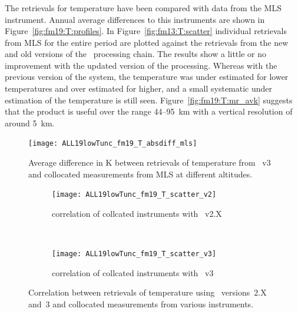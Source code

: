 
\subsubsection{}
\label{sec:fm19:comparison:temperature}
The retrievals for temperature have been compared with data from the MLS
instrument. Annual average differences to this instruments are shown in
Figure~\ref{fig:fm19:T:profiles}. In Figure~\ref{fig:fm13:T:scatter} individual
retrievals from MLS for the entire period are plotted against the retrievals
from the new and old versions of the \smr\ processing chain. The results show a
little or no improvement with the updated version of the processing. Whereas
with the previous version of the system, the temperature was under estimated
for lower temperatures and over estimated for higher, and a small systematic
under estimation of the temperature is still seen.
Figure~\ref{fig:fm19:T:mr_avk} suggests that the product is useful over the
range 44--95~km with a vertical resolution of around 5~km.

\begin{figure}[tbhp]
    \centering
    \texttt{[image: ALL19lowTunc\_fm19\_T\_absdiff\_mls]}
    \caption{Average difference in K between retrievals of temperature from
    \smr~v3 and collocated measurements from MLS at different altitudes.}
    \label{fig:fm19:T:profiles}
    \label{fig:fm19:T:profiles:MLS}
\end{figure}

\begin{figure}[tbhp]
    \centering
    \begin{subfigure}[b]{0.49\textwidth}
        \texttt{[image: ALL19lowTunc\_fm19\_T\_scatter\_v2]}
        \caption{correlation of collcated instruments with \smr~v2.X}
        \label{fig:fm19:T:scatter:v2}
    \end{subfigure}
    \,
    \begin{subfigure}[b]{0.49\textwidth}
        \texttt{[image: ALL19lowTunc\_fm19\_T\_scatter\_v3]}
        \caption{correlation of collcated instruments with \smr~v3}
        \label{fig:fm19:T:scatter:v3}
    \end{subfigure}
    \caption{Correlation between retrievals of temperature using \smr\
    versions~2.X and~3 and collocated measurements from various instruments.}
    \label{fig:fm19:T:scatter}
\end{figure}

